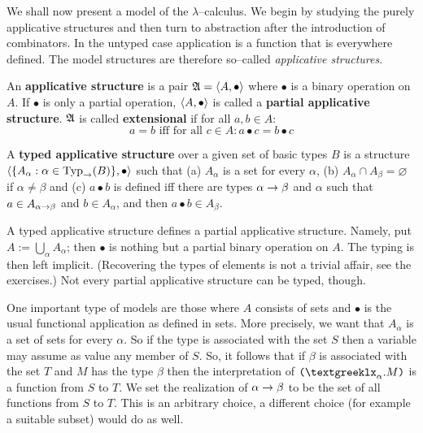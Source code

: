 We shall now present a model of the $\lambda$--calculus. We begin 
by studying the purely applicative structures and then turn to 
abstraction after the introduction of combinators. In the untyped 
case application is a function that is everywhere defined.
The model structures are therefore so--called
{\it applicative structures}.
\begin{defn}
An \textbf{applicative structure} is a pair $\mathfrak{A} = \langle A,
\bullet\rangle$ where $\bullet$ is a binary operation on $A$. If
$\bullet$ is only a partial operation, $\langle A, \bullet\rangle$ is
called a \textbf{partial applicative structure}. $\mathfrak{A}$ is called
\textbf{extensional} if for all $a, b \in A$:
\begin{equation}
a = b \text{ iff for all }c \in A:
    a \bullet c = b \bullet c 
\end{equation}
\end{defn}
\begin{defn}
A \textbf{typed applicative structure} over a given set of basic
types $B$ is a structure $\langle \{A_{\alpha} : \alpha \in \operatorname{Typ}_{\rightarrow}(B)\},
\bullet\rangle$ such that (a) $A_{\alpha}$ is a set
for every $\alpha$, (b) $A_{\alpha} \cap A_{\beta} = \varnothing$ 
if $\alpha \neq \beta$ and (c) $a \bullet b$ is defined iff
there are types $\alpha\rightarrow \beta$ and $\alpha$
such that $a \in A_{\alpha \rightarrow \beta}$ and $b \in A_{\alpha}$,
and then $a \bullet b \in A_{\beta}$.
\end{defn}
A typed applicative structure defines a partial applicative
structure. Namely, put $A := \bigcup_{\alpha} A_{\alpha}$; then
$\bullet$ is nothing but a partial binary operation on $A$. The
typing is then left implicit. (Recovering the types of elements is
not a trivial affair, see the exercises.) Not every partial
applicative structure can be typed, though.

One important type of models are those where $A$ consists of sets and
$\bullet$ is the usual functional application as defined in sets.
More precisely, we want that $A_{\alpha}$ is a set of sets for
every $\alpha$. So if the type is associated with the set $S$ then
a variable may assume as value any member of $S$. So, it follows
that if $\beta$ is associated with the set $T$ and $M$ has the
type $\beta$ then
the interpretation of $\mbox{\tt (\stlambda x}_{\alpha}.%
M\mbox{\tt )}$ is a function from $S$ to $T$. We set the
realization of $\alpha \rightarrow \beta$ to be the set of all functions
from $S$ to $T$. This is an arbitrary choice, a different
choice (for example a suitable subset) would do as well.

